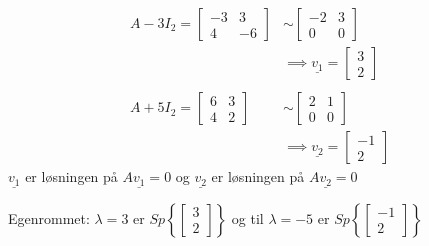\documentclass[11pt, a4paper, norsk]{article}
\begin{document}
\begin{Example}{}{}
            \begin{align*}
                A - 3I_{2} = \begin{bmatrix}
                    -3 & 3 \\
                    4 & -6
                \end{bmatrix} &\sim \begin{bmatrix}
                -2 & 3 \\
                0 & 0
                \end{bmatrix}
                \\
                &\implies \underline{v_1} = \begin{bmatrix}
                    3 \\
                    2
                \end{bmatrix}
                \\
                \\
                A + 5I_{2} = \begin{bmatrix}
                    6 & 3 \\
                    4 & 2
                \end{bmatrix} &\sim \begin{bmatrix}
                2 & 1 \\
                0 & 0
                \end{bmatrix}
                \\
                &\implies \underline{v_{2}} = \begin{bmatrix}
                    -1 \\
                    2
            \end{bmatrix}
            \end{align*}
            $\underline{v_1}$ er løsningen på $A\underline{v_1} = 0$ og  $\underline{v_2}$ er løsningen på $A\underline{v_2} = 0$ 
            
            Egenrommet:
            $\lambda = 3$ er $Sp\left\{\begin{bmatrix}
                3 \\
                2
            \end{bmatrix}\right\}$ og til $\lambda = -5$ er $Sp\left\{\begin{bmatrix}
                -1 \\
                2
            \end{bmatrix}\right\}$
        \end{Example}
\end{document}
